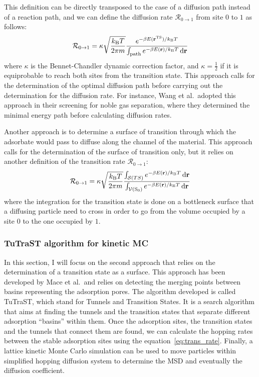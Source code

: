 \documentclass[main]{subfiles}
\begin{document}
This definition can be directly transposed to the case of a diffusion path instead of a reaction path, and we can define the diffusion rate $\mathcal{R}_{0\rightarrow 1}$ from site $0$ to $1$ as follows:
\begin{equation}\label{eq:trans_rate_path}
  \mathcal{R}_{0\rightarrow 1} = \kappa\sqrt{\frac{k_{\text{B}}T}{2\pi m}}\frac{e^{-\beta E(\mathbf{r}^{\text{TS}})/k_{\text{B}}T}}{\int_{\text{path}}e^{-\beta E(\mathbf{r})/k_{\text{B}}T}\mathop{}\mathopen{}\mathrm{d}\mathbf{r}}
\end{equation}
where $\kappa$ is the Bennet-Chandler dynamic correction factor,\autocite{BENNETT1977} and  $\kappa=\tfrac{1}{2}$ if it is equiprobable to reach both sites from the transition state. This approach calls for the determination of the optimal diffusion path before carrying out the determination for the diffusion rate. For instance, Wang et al.\ adopted this approach in their screening for noble gas separation, where they determined the minimal energy path before calculating diffusion rates.\autocite{Wang_2022}

Another approach is to determine a surface of transition through which the adsorbate would pass to diffuse along the channel of the material. This approach calls for the determination of the surface of transition only, but it relies on another definition of the transition rate $\mathcal{R}_{0\rightarrow 1}$:
\begin{equation}\label{eq:trans_rate}
  \mathcal{R}_{0\rightarrow 1} = \kappa\sqrt{\frac{k_{\text{B}}T}{2\pi m}}\frac{\int_{\mathcal{S}(TS)}e^{-\beta E(\mathbf{r})/k_{\text{B}}T}\mathop{}\mathopen{}\mathrm{d}\mathbf{r}}{\int_{\mathcal{V}(\text{S}_0)}e^{-\beta E(\mathbf{r})/k_{\text{B}}T}\mathop{}\mathopen{}\mathrm{d}\mathbf{r}}
\end{equation}
where the integration for the transition state is done on a bottleneck surface that a diffusing particle need to cross in order to go from the volume occupied by a site $0$ to the one occupied by $1$.

\subsubsection{TuTraST algorithm for kinetic MC}\label{sct:tutrast}

In this section, I will focus on the second approach that relies on the determination of a transition state as a surface. This approach has been developed by Mace et al.\autocite{Mace_2019}\ and relies on detecting the merging points between basins representing the adsorption pores. The algorithm developed is called TuTraST, which stand for Tunnels and Transition States. It is a search algorithm that aims at finding the tunnels and the transition states that separate different adsorption ``basins'' within them. Once the adsorption sites, the transition states and the tunnels that connect them are found, we can calculate the hopping rates between the stable adsorption sites using the equation~\ref{eq:trans_rate}. Finally, a lattice kinetic Monte Carlo simulation can be used to move particles within simplified hopping diffusion system to determine the MSD and eventually the diffusion coefficient. 
\end{document}
